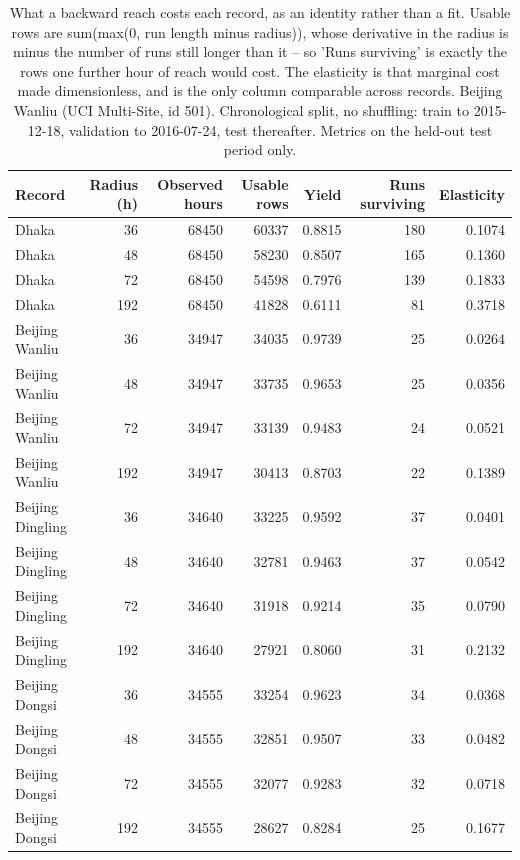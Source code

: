 \begin{table}[htbp]
\caption{What a backward reach costs each record, as an identity rather than a fit. Usable rows are sum(max(0, run length minus radius)), whose derivative in the radius is minus the number of runs still longer than it -- so 'Runs surviving' is exactly the rows one further hour of reach would cost. The elasticity is that marginal cost made dimensionless, and is the only column comparable across records. Beijing Wanliu (UCI Multi-Site, id 501). Chronological split, no shuffling: train to 2015-12-18, validation to 2016-07-24, test thereafter. Metrics on the held-out test period only.}
\label{tab:decision_rule}
\begin{tabular}{lrrrrrr}
\toprule
Record & Radius (h) & Observed hours & Usable rows & Yield & Runs surviving & Elasticity \\
\midrule
Dhaka & 36 & 68450 & 60337 & 0.8815 & 180 & 0.1074 \\
Dhaka & 48 & 68450 & 58230 & 0.8507 & 165 & 0.1360 \\
Dhaka & 72 & 68450 & 54598 & 0.7976 & 139 & 0.1833 \\
Dhaka & 192 & 68450 & 41828 & 0.6111 & 81 & 0.3718 \\
Beijing Wanliu & 36 & 34947 & 34035 & 0.9739 & 25 & 0.0264 \\
Beijing Wanliu & 48 & 34947 & 33735 & 0.9653 & 25 & 0.0356 \\
Beijing Wanliu & 72 & 34947 & 33139 & 0.9483 & 24 & 0.0521 \\
Beijing Wanliu & 192 & 34947 & 30413 & 0.8703 & 22 & 0.1389 \\
Beijing Dingling & 36 & 34640 & 33225 & 0.9592 & 37 & 0.0401 \\
Beijing Dingling & 48 & 34640 & 32781 & 0.9463 & 37 & 0.0542 \\
Beijing Dingling & 72 & 34640 & 31918 & 0.9214 & 35 & 0.0790 \\
Beijing Dingling & 192 & 34640 & 27921 & 0.8060 & 31 & 0.2132 \\
Beijing Dongsi & 36 & 34555 & 33254 & 0.9623 & 34 & 0.0368 \\
Beijing Dongsi & 48 & 34555 & 32851 & 0.9507 & 33 & 0.0482 \\
Beijing Dongsi & 72 & 34555 & 32077 & 0.9283 & 32 & 0.0718 \\
Beijing Dongsi & 192 & 34555 & 28627 & 0.8284 & 25 & 0.1677 \\
\bottomrule
\end{tabular}
\end{table}
